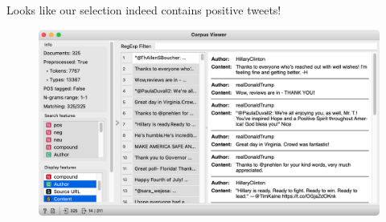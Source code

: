 Looks like our selection indeed contains positive tweets!

\vspace{-0.2cm}
\begin{figure}[h]
  \centering
  \includegraphics[width=\linewidth]{corpus-viewer.png}%
  \caption{$\;$}
\end{figure}
\vspace{-0.3cm}
